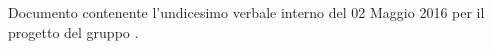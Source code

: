 Documento contenente l'undicesimo verbale interno del 02 Maggio 2016 per il progetto \progetto{} del gruppo \gruppo{}.
